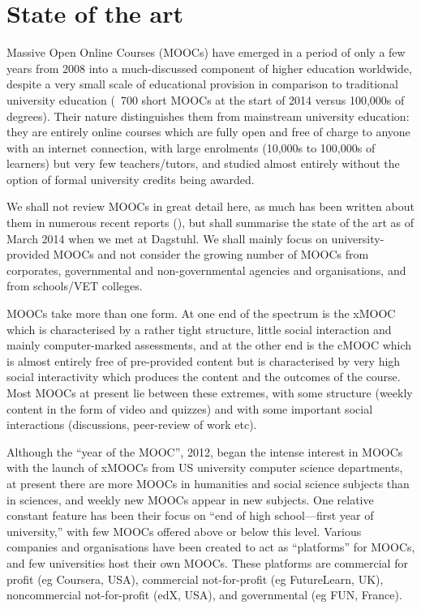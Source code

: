 \section{State of the art}

Massive Open Online Courses (MOOCs) have emerged in a period of only a
few years from 2008 into a much-discussed component of higher education
worldwide, despite a very small scale of educational provision in
comparison to traditional university education (~700 short MOOCs at the
start of 2014 versus 100,000s of degrees).  Their nature distinguishes
them from mainstream university education: they are entirely online
courses which are fully open and free of charge to anyone with an
internet connection, with large enrolments (10,000s to 100,000s of
learners) but very few teachers/tutors, and studied almost entirely
without the option of formal university credits being awarded.

We shall not review MOOCs in great detail here, as much has been written
about them in numerous recent reports (), but shall summarise the state of
the art as of March 2014 when we met at Dagstuhl.
We shall mainly focus on university-provided MOOCs and not consider
the growing number of MOOCs from corporates, governmental and
non-governmental agencies and organisations, and from schools/VET
colleges.


MOOCs take more than one form.  At one end of the spectrum is the xMOOC
which is characterised by a rather tight structure, little social
interaction and mainly computer-marked assessments, and at the other end
is the cMOOC which is almost entirely free of pre-provided content but
is characterised by very high social interactivity which produces the
content and the outcomes of the course.  Most MOOCs at present lie
between these extremes, with some structure (weekly content in the form
of video and quizzes) and with some important social interactions
(discussions, peer-review of work etc).

Although the ``year of the MOOC'', 2012, began the intense interest in
MOOCs with the launch of xMOOCs from US university computer science
departments, at present there are more MOOCs in humanities and social
science subjects than in sciences, and weekly new MOOCs appear in new
subjects.  One relative constant feature has been their focus on ``end of
high school---first year of university,'' with few MOOCs offered above or
below this level.  Various companies and organisations have been created
to act as   ``platforms'' for MOOCs, and few universities host their own
MOOCs. These platforms are commercial for profit (eg Coursera, USA),
commercial not-for-profit (eg FutureLearn, UK), noncommercial
not-for-profit (edX, USA), and governmental (eg FUN, France).

